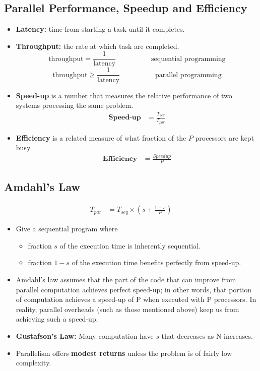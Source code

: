 \documentclass[../main.tex]{subfiles}
\begin{document}
\subsection{Parallel Performance, Speedup and Efficiency}

\begin{itemize}
	\item \textbf{Latency:} time from starting a task until it completes.
	\item \textbf{Throughput:} the rate at which task are completed.
	   \[
		      \text{throughput}  = \frac{1}{\text{latency}}   \hspace{5em}  \text{sequential programming}
		      \]
	      \[
	      \text{throughput}  \geq \frac{1}{\text{latency}} \hspace{5em}\text{parallel programming}
	      \]
	\item \textbf{Speed-up} is a number that measures the relative performance of two systems processing the same problem.
	      \begin{align*}
		      \textbf{Speed-up} & = \frac{T_{seq}}{T_{par}}
	      \end{align*}
	\item \textbf{Efficiency} is a related measure of what fraction of the $P$ processors are kept busy
	      \begin{align*}
		      \textbf{Efficiency} & = \frac{Speedup}{P}
	      \end{align*}
\end{itemize}

\subsection{Amdahl's Law}

\begin{align*}
	T_{par} & = T_{seq} \times (s + \frac{1-s}{P})
\end{align*}

\begin{itemize}
	\item Give a sequential program where
	      \begin{itemize}
		      \item fraction \(s\) of the execution time is inherently sequential.
		      \item fraction \(1-s\) of the execution time benefits perfectly from speed-up.
	      \end{itemize}
	\item Amdahl’s law assumes that the part of the code that can improve from parallel computation achieves perfect speed-up; in other words, that portion of computation achieves a speed-up of P when executed with P processors. In reality, parallel overheads (such as those mentioned above) keep us from achieving such a speed-up.
	\item \textbf{Gustafson's Law:} Many computation have \(s\) that decreases as N increases.
	\item Parallelism offers \textbf{modest returns} unless the problem is of fairly low complexity.
\end{itemize}
\end{document}
